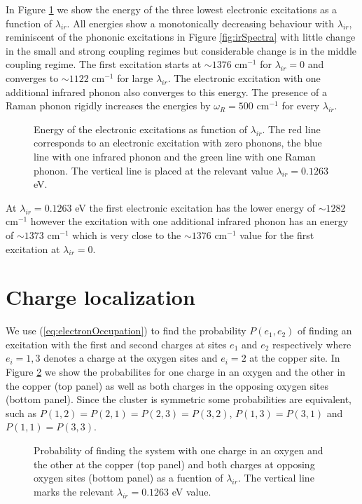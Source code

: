 In Figure \ref{fig:electrSpectra} we show the energy of the three lowest electronic excitations as a function of $\lambda_{ir}$.
All energies show a monotonically decreasing behaviour with $\lambda_{ir}$, reminiscent of the phononic excitations in Figure \ref{fig:irSpectra} with little change in the small and strong coupling regimes but considerable change is in the middle coupling regime.
The first excitation starts at $\sim 1376$ cm$^{-1}$ for $\lambda_{ir}=0$ and converges to $\sim 1122$ cm$^{-1}$ for large $\lambda_{ir}$.
The electronic excitation with one additional infrared phonon also converges to this energy.
The presence of a Raman phonon rigidly increases the energies by $\omega_R=500$ cm$^{-1}$ for every $\lambda_{ir}$.
%
\begin{figure}[ht]
  \centering
  
  \caption[Energy of the electronic excitations as function of $\lambda_{ir}$.]
  {Energy of the electronic excitations as function of $\lambda_{ir}$. 
    The red line corresponds to an electronic excitation with zero phonons, the blue line with one infrared phonon and the green line with one Raman phonon.
    The vertical line is placed at the relevant value $\lambda_{ir}=0.1263$ eV.}
  \label{fig:electrSpectra}
\end{figure}

At $\lambda_{ir}=0.1263$ eV the first electronic excitation has the lower energy of $\sim 1282$ cm$^{-1}$ however the excitation with one additional infrared phonon has an energy of $\sim 1373$ cm$^{-1}$ which is very close to the $\sim 1376$ cm$^{-1}$ value for the first excitation at $\lambda_{ir}=0$.

\section{Charge localization}

We use (\ref{eq:electronOccupation}) to find the probability $P(e_1,e_2)$ of finding an excitation with the first and second charges at sites $e_1$ and $e_2$ respectively where $e_i=1,3$ denotes a charge at the oxygen sites and $e_i=2$ at the copper site.
In Figure \ref{fig:electronicOccupations} we show the probabilites for one charge in an oxygen and the other in the copper (top panel) as well as both charges in the opposing oxygen sites (bottom panel).
Since the cluster is symmetric some probabilities are equivalent, such as $P(1,2)=P(2,1)=P(2,3)=P(3,2)$, $P(1,3)=P(3,1)$ and $P(1,1)=P(3,3)$.

\begin{figure}[ht]
  \centering
  
  \caption[Probability of finding the system with one charge in an oxygen and the other at the copper and both charges at opposing oxygen sites.]
  {Probability of finding the system with one charge in an oxygen and the other at the copper (top panel) and both charges at opposing oxygen sites (bottom panel) as a fucntion of $\lambda_{ir}$.
  The vertical line marks the relevant $\lambda_{ir}=0.1263$ eV value.}
  \label{fig:electronicOccupations}
\end{figure}

